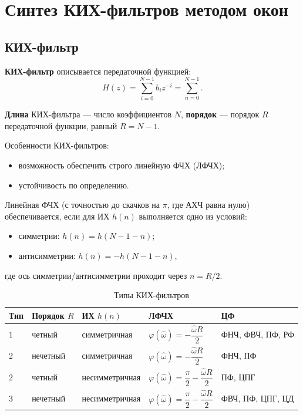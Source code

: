 \documentclass[a4paper, 14pt]{extarticle}
\begin{document}
\section{Синтез КИХ-фильтров методом окон}
\subsection{КИХ-фильтр}\label{subsec:fir}
\textbf{КИХ-фильтр} описывается передаточной функцией:
\begin{equation}
    H(z) = \sum^{N-1}_{i=0} b_i z^{-i} = \sum^{N-1}_{n=0}.
\end{equation}

\textbf{Длина} КИХ-фильтра --- число коэффициентов $N$, \textbf{порядок} --- порядок $R$ передаточной функции, равный $R=N-1$.

Особенности КИХ-фильтров:
\begin{itemize}
    \item возможность обеспечить строго линейную ФЧХ (ЛФЧХ);
    \item устойчивость по определению.
\end{itemize}

Линейная ФЧХ (с точностью до скачков на $\pi$, где АХЧ равна нулю) обеспечивается, если для ИХ $h(n)$ выполняется одно из условий:
\begin{itemize}
    \item симметрии: $h(n) = h(N - 1 - n)$;
    \item антисимметрии: $h(n) = -h(N-1-n)$,
\end{itemize}
где ось симметрии/антисимметрии проходит через $n=R/2$.


\begin{table}[h]
\centering
\caption{Типы КИХ-фильтров}
\begin{tabularx}{\textwidth}{@{}lllXl@{}}
\toprule
\textbf{Тип} & \textbf{Порядок $R$} & \textbf{ИХ $h(n)$} & \textbf{ЛФЧХ} & \textbf{ЦФ}      \\ \midrule
1            & четный               & симметричная       & $\varphi(\hat{\omega}) = - \dfrac{\hat{\omega}R}{2} $ & ФНЧ, ФВЧ, ПФ, РФ \\
2            & нечетный             & симметричная       & $\varphi(\hat{\omega}) = - \dfrac{\hat{\omega}R}{2}$ & ФНЧ, ПФ          \\
2            & четный               & несимметричная     & $ \varphi(\hat{\omega}) = \dfrac{\pi}{2} - \dfrac{\hat{\omega}R}{2}$ & ПФ, ЦПГ          \\
3            & нечетный             & несимметричная     & $\varphi(\hat{\omega}) = \dfrac{\pi}{2} - \dfrac{\hat{\omega}R}{2}$ & ФВЧ, ПФ, ЦПГ, ЦД \\ \bottomrule
\end{tabularx}
\end{table}
\end{document}
